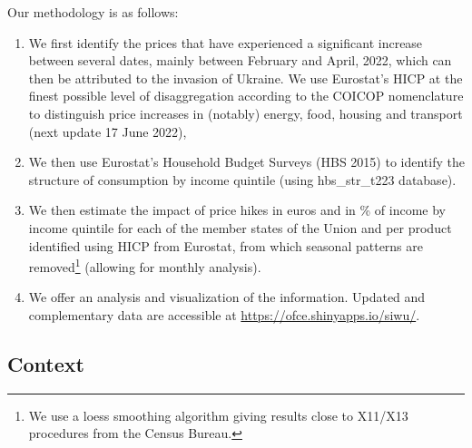 \documentclass[
  9pt,
  a4paper,
  numbers=noendperiod,
  DIV=12]{scrartcl}
\providecommand{\tightlist}{%
  \setlength{\itemsep}{0pt}\setlength{\parskip}{0pt}}\usepackage{longtable,booktabs,array}
\begin{document}
Our methodology is as follows:

\begin{enumerate}
\def\labelenumi{\arabic{enumi}.}
\tightlist
\item
  We first identify the prices that have experienced a significant
  increase between several dates, mainly between February and April,
  2022, which can then be attributed to the invasion of Ukraine. We use
  Eurostat's HICP at the finest possible level of disaggregation
  according to the COICOP nomenclature to distinguish price increases in
  (notably) energy, food, housing and transport (next update 17 June
  2022),
\item
  We then use Eurostat's Household Budget Surveys (HBS 2015) to identify
  the structure of consumption by income quintile (using hbs\_str\_t223
  database).
\item
  We then estimate the impact of price hikes in euros and in \% of
  income by income quintile for each of the member states of the Union
  and per product identified using HICP from Eurostat, from which
  seasonal patterns are removed\footnote{We use a loess smoothing
    algorithm giving results close to X11/X13 procedures from the Census
    Bureau.} (allowing for monthly analysis).
\item
  We offer an analysis and visualization of the information. Updated and
  complementary data are accessible at
  \url{https://ofce.shinyapps.io/siwu/}.
\end{enumerate}

\hypertarget{context}{%
\subsection{Context}\label{context}}
\end{document}
